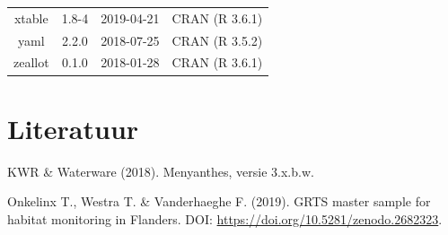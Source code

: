 \documentclass[11pt,]{book}
\begin{document}
\begin{longtable}[]{@{}cccc@{}}
\begin{minipage}[t]{0.18\columnwidth}\centering\strut
xtable\strut
\end{minipage} & \begin{minipage}[t]{0.19\columnwidth}\centering\strut
1.8-4\strut
\end{minipage} & \begin{minipage}[t]{0.16\columnwidth}\centering\strut
2019-04-21\strut
\end{minipage} & \begin{minipage}[t]{0.36\columnwidth}\centering\strut
CRAN (R 3.6.1)\strut
\end{minipage}\tabularnewline
\begin{minipage}[t]{0.18\columnwidth}\centering\strut
yaml\strut
\end{minipage} & \begin{minipage}[t]{0.19\columnwidth}\centering\strut
2.2.0\strut
\end{minipage} & \begin{minipage}[t]{0.16\columnwidth}\centering\strut
2018-07-25\strut
\end{minipage} & \begin{minipage}[t]{0.36\columnwidth}\centering\strut
CRAN (R 3.5.2)\strut
\end{minipage}\tabularnewline
\begin{minipage}[t]{0.18\columnwidth}\centering\strut
zeallot\strut
\end{minipage} & \begin{minipage}[t]{0.19\columnwidth}\centering\strut
0.1.0\strut
\end{minipage} & \begin{minipage}[t]{0.16\columnwidth}\centering\strut
2018-01-28\strut
\end{minipage} & \begin{minipage}[t]{0.36\columnwidth}\centering\strut
CRAN (R 3.6.1)\strut
\end{minipage}\tabularnewline
\bottomrule
\end{longtable}

\chapter*{Literatuur}\label{literatuur}

\hypertarget{refs}{}
\hypertarget{ref-RN5899}{}
KWR \& Waterware (2018). Menyanthes, versie 3.x.b.w.

\hypertarget{ref-onkelinx_grts_2019}{}
Onkelinx T., Westra T. \& Vanderhaeghe F. (2019). GRTS master sample for
habitat monitoring in Flanders. DOI:
\url{https://doi.org/10.5281/zenodo.2682323}.
\end{document}
